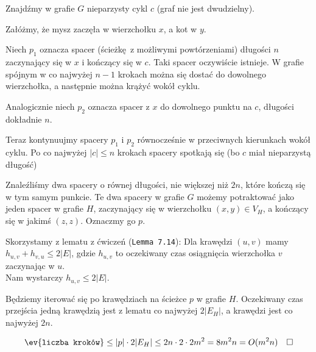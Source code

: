 Znajdźmy w grafie \(G\) nieparzysty cykl \(c\)
(graf nie jest dwudzielny).

Załóżmy, że mysz zaczęła w wierzchołku \(x\), a kot w \(y\).

Niech \(p_1\) oznacza spacer (ścieżkę z możliwymi powtórzeniami)
długości \(n\) zaczynający się w \(x\) i kończący się w \(c\).
Taki spacer oczywiście istnieje. W grafie spójnym w co najwyżej
\(n-1\) krokach można się dostać do dowolnego wierzchołka,
a następnie można krążyć wokół cyklu.

Analogicznie niech \(p_2\) oznacza spacer z \(x\) do dowolnego
punktu na \(c\), długości dokładnie \(n\).

Teraz kontynuujmy spacery \(p_1\) i \(p_2\) równocześnie w
przeciwnych kierunkach wokół cyklu. Po co najwyżej
\( |c| \leq n \) krokach spacery spotkają się
(bo \(c\) miał nieparzystą długość)

Znaleźliśmy dwa spacery o równej długości, nie większej niż \(2n\),
które kończą się w tym samym punkcie.
Te dwa spacery w grafie \(G\) możemy potraktować jako jeden spacer w
grafie \(H\), zaczynający się w wierzchołku \((x, y) \in V_H\), a
kończący się w jakimś \((z, z)\). Oznaczmy go \(p\).

Skorzystamy z lematu z ćwiczeń (\texttt{Lemma 7.14}):
Dla krawędzi \((u, v)\) mamy \(h_{u, v} + h_{v, u} \leq 2|E|\),
gdzie \(h_{u, v}\) to oczekiwany czas osiągnięcia wierzchołka \(v\)
zaczynając w \(u\).\\
Nam wystarczy \(h_{u, v} \leq 2|E|\).

Będziemy iterować się po krawędziach na ścieżce \(p\) w grafie \(H\).
Oczekiwany czas przejścia jedną krawędzią jest z lematu
co najwyżej \(2|E_H|\), a krawędzi jest co najwyżej \(2n\).

\[
	\ev{\texttt{liczba kroków}} \leq |p| \cdot 2|E_H|
	\leq 2n \cdot 2 \cdot 2m^2 = 8m^2n = O(m^2n)
	\quad \square
\]

